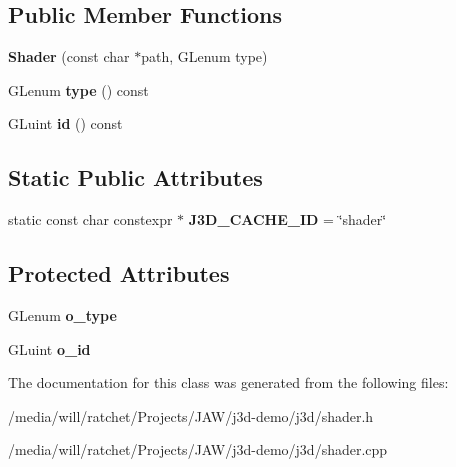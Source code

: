 \subsection*{Public Member Functions}
\begin{DoxyCompactItemize}
\item 
\hypertarget{classj3d_1_1ShaderProgram_1_1Shader_abc71dc01c2917b32dfb3040dcb5f9e0b}{}{\bfseries Shader} (const char $\ast$path, G\+Lenum type)\label{classj3d_1_1ShaderProgram_1_1Shader_abc71dc01c2917b32dfb3040dcb5f9e0b}

\item 
\hypertarget{classj3d_1_1ShaderProgram_1_1Shader_af793368e86747dda96c3c372a4a80bbc}{}G\+Lenum {\bfseries type} () const \label{classj3d_1_1ShaderProgram_1_1Shader_af793368e86747dda96c3c372a4a80bbc}

\item 
\hypertarget{classj3d_1_1ShaderProgram_1_1Shader_ac5fdb3bfe00d0fef2b88783f98c59843}{}G\+Luint {\bfseries id} () const \label{classj3d_1_1ShaderProgram_1_1Shader_ac5fdb3bfe00d0fef2b88783f98c59843}

\end{DoxyCompactItemize}
\subsection*{Static Public Attributes}
\begin{DoxyCompactItemize}
\item 
\hypertarget{classj3d_1_1ShaderProgram_1_1Shader_a20f3b954a556f5fc2c30cf12e0a29a9c}{}static const char constexpr $\ast$ {\bfseries J3\+D\+\_\+\+C\+A\+C\+H\+E\+\_\+\+I\+D} = \char`\"{}shader\char`\"{}\label{classj3d_1_1ShaderProgram_1_1Shader_a20f3b954a556f5fc2c30cf12e0a29a9c}

\end{DoxyCompactItemize}
\subsection*{Protected Attributes}
\begin{DoxyCompactItemize}
\item 
\hypertarget{classj3d_1_1ShaderProgram_1_1Shader_a3f84fddc2b154de37b8e9632bc10c7f8}{}G\+Lenum {\bfseries o\+\_\+type}\label{classj3d_1_1ShaderProgram_1_1Shader_a3f84fddc2b154de37b8e9632bc10c7f8}

\item 
\hypertarget{classj3d_1_1ShaderProgram_1_1Shader_accf4054b26f49c1ac24f96c54330c028}{}G\+Luint {\bfseries o\+\_\+id}\label{classj3d_1_1ShaderProgram_1_1Shader_accf4054b26f49c1ac24f96c54330c028}

\end{DoxyCompactItemize}


The documentation for this class was generated from the following files\+:\begin{DoxyCompactItemize}
\item 
/media/will/ratchet/\+Projects/\+J\+A\+W/j3d-\/demo/j3d/shader.\+h\item 
/media/will/ratchet/\+Projects/\+J\+A\+W/j3d-\/demo/j3d/shader.\+cpp\end{DoxyCompactItemize}
